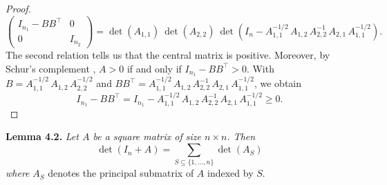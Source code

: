 \documentclass[12pt]{article}
\begin{document}
\begin{proof}
\[\begin{pmatrix}
I_{n_1} - BB^\top & 0 \\
0 & I_{n_2}
\end{pmatrix}
= \det(A_{1,1}) \ \det(A_{2,2}) \ \det\!\left(I_n - A^{-1/2}_{1,1} \, A_{1,2} \, A^{-1}_{2,2} \, A_{2,1} \, A^{-1/2}_{1,1}\right).
\]
The second relation tells us that the central matrix is positive. Moreover, by Schur's complement \cite{wiki:schur}, $A > 0$ if and only if $I_{n_1} - B B^\top > 0$. With $B = A^{-1/2}_{1,1} \, A_{1,2} \, A^{-1/2}_{2,2}$ and $B B^\top = A^{-1/2}_{1,1} \, A_{1,2} \, A^{-1}_{2,2} \, A_{2,1} \, A^{-1/2}_{1,1}$, we obtain
\[
I_{n_1} - B B^\top = I_{n_1} - A^{-1/2}_{1,1} \, A_{1,2} \, A^{-1}_{2,2} \, A_{2,1} \, A^{-1/2}_{1,1} \geq 0.
\]
\end{proof}

\textbf{Lemma 4.2.} \textit{Let $A$ be a square matrix of size $n \times n$. Then}
\[
\det(I_n + A) = \sum_{S \subseteq \{1, \ldots, n\}} \det(A_S)
\]
\textit{where} $A_S$ denotes the principal submatrix of $A$ indexed by $S$.
\end{document}
